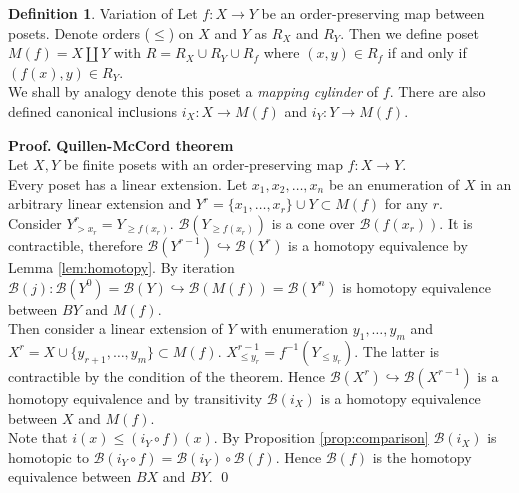 \documentclass[english,12pt]{article}
\newcounter{stmcounter}[section]
\numberwithin{equation}{section}
\theoremstyle{definition}
\newtheorem{definition}[stmcounter]{Definition}
\theoremstyle{remark}
\newenvironment{pf}{\noindent\textbf{Proof.}}{\qed}
\newcommand{\define}[1]{{\textit{#1}}}
\renewcommand{\leq}{\leqslant}
\renewcommand{\geq}{\geqslant}
\begin{document}
\begin{definition} {Variation of \cite[Proposition 2.1]{Bar11}}
  Let $f : X \to Y$ be an order-preserving map between posets. Denote orders ($\leq$) on $X$ and $Y$ as $R_X$ and $R_Y$. Then we define poset $M(f) = X \coprod Y$ with $R = R_X \cup R_Y \cup R_{f}$ where $(x,y) \in R_f$ if and only if $(f(x),y) \in R_Y$.\\

  We shall by analogy denote this poset a \define{mapping cylinder} of $f$. There are also defined canonical inсlusions $i_X : X \to M(f)$ and $i_Y : Y \to M(f)$.
\end{definition}

\begin{pf} \textbf{Quillen-McCord theorem}\\
  Let $X, Y$ be finite posets with an order-preserving map $f : X \to Y$.\\

  Every poset has a linear extension. Let $x_1, x_2, \ldots, x_n$ be an enumeration of $X$ in an arbitrary linear extension and $Y^r = \{x_1,\ldots,x_r\} \cup Y \subset M(f)$ for any $r$.\\

  Consider $Y^r_{>x_r} = Y_{\geq f(x_r)}$. $\mathcal{B}(Y_{\geq f(x_r)})$ is a cone over $\mathcal{B}(f(x_r))$. It is contractible, therefore $\mathcal{B}(Y^{r-1}) \hookrightarrow \mathcal{B}(Y^{r})$ is a homotopy equivalence by Lemma \ref{lem:homotopy}. By iteration $\mathcal{B}(j) : \mathcal{B}(Y^{0}) = \mathcal{B}(Y) \hookrightarrow \mathcal{B}(M(f)) = \mathcal{B}(Y^n)$ is homotopy equivalence between $BY$ and $M(f)$.\\

  Then consider a linear extension of $Y$ with enumeration $y_1,\ldots,y_m$ and $X^r = X \cup \{y_{r+1},\ldots,y_m\} \subset M(f)$. $X^{r-1}_{\leq y_r} = f^{-1}(Y_{\leqslant y_r})$. The latter is contractible by the condition of the theorem. Hence $\mathcal{B}(X^{r}) \hookrightarrow \mathcal{B}(X^{r-1})$ is a homotopy equivalence and by transitivity $\mathcal{B}(i_X)$ is a homotopy equivalence between $X$ and $M(f)$.\\

  Note that $i(x) \leqslant (i_Y \circ f)(x)$. By Proposition \ref{prop:comparison} $\mathcal{B}(i_X)$ is homotopic to $\mathcal{B}(i_Y \circ f) = \mathcal{B}(i_Y) \circ \mathcal{B}(f)$. Hence $\mathcal{B}(f)$ is the homotopy equivalence between $BX$ and $BY$.
\end{pf}
\end{document}
